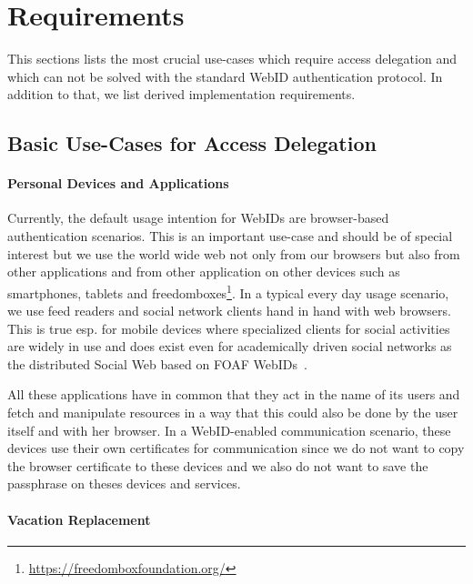 \documentclass[a4paper]{llncs}
\begin{document}
\section{Requirements}

This sections lists the most crucial use-cases which require access delegation and which can not be solved with the standard WebID authentication protocol.
In addition to that, we list derived implementation requirements.

\subsection{Basic Use-Cases for Access Delegation}\label{sec:usecases}

\paragraph{Personal Devices and Applications}

Currently, the default usage intention for WebIDs are browser-based authentication scenarios.
This is an important use-case and should be of special interest but we use the world wide web not only from our browsers but also from other applications and from other application on other devices such as smartphones, tablets and freedomboxes\footnote{\url{https://freedomboxfoundation.org/}}.
In a typical every day usage scenario, we use feed readers and social network clients hand in hand with web browsers.
This is true esp. for mobile devices where specialized clients for social activities are widely in use and does exist even for academically driven social networks as the distributed Social Web  %
 based on FOAF WebIDs~\cite{tramp-s-2011--a}.

All these applications have in common that they act in the name of its users and fetch and manipulate resources in a way that this could also be done by the user itself and with her browser.
In a WebID-enabled communication scenario, these devices use their own certificates for communication since we do not want to copy the browser certificate to these devices and we also do not want to save the passphrase on theses devices and services.


\paragraph{Vacation Replacement}
\end{document}

